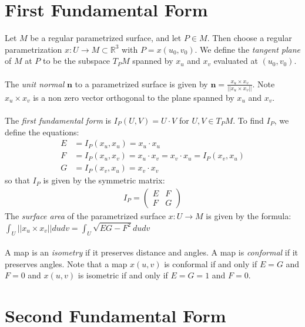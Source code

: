 \documentclass{article}
\begin{document}
    \section*{First Fundamental Form}
    Let $M$ be a regular parametrized surface, and let $P\in M$. Then choose a regular parametrization $x:U\to M\subset\mathbb{R}^3$
    with $P = x(u_0,v_0)$. We define the \textit{tangent plane} of $M$ at $P$ to be the subspace $T_PM$ spanned by $x_u$ and
    $x_v$ evaluated at $(u_0,v_0)$.\\\\
    The \textit{unit normal} $\mathbf{n}$ to a parametrized surface is given by $\mathbf{n} = \frac{x_u\times x_v}{||x_u\times x_v||}$.
    Note $x_u \times x_v$ is a non zero vector orthogonal to the plane spanned by $x_u$ and $x_v$.\\\\
    The \textit{first fundamental form} is $I_P(U,V) = U\cdot V$ for $U,V\in T_PM$. To find $I_P$, we define the equations:
    \begin{align*}
        E &= I_P(x_u,x_u) = x_u\cdot x_u \\
        F &= I_P(x_u,x_v) = x_u\cdot x_v = x_v\cdot x_u = I_P(x_v,x_u) \\
        G &= I_P(x_v,x_u) = x_v\cdot x_v
    \end{align*}
    so that $I_P$ is given by the symmetric matrix:
    \begin{align*} 
        I_P = \begin{pmatrix} E & F \\ F & G \end{pmatrix}
    \end{align*}
    The \textit{surface area} of the parametrized surface $x: U\to M$ is given by the formula:
    $ \int_U ||x_u\times x_v||dudv = \int_U \sqrt{EG-F^2}dudv $ \\\\
    A map is an \textit{isometry} if it preserves distance and angles. A map is \textit{conformal} if it preserves angles.
    Note that a map $x(u,v)$ is conformal if and only if $E=G$ and $F=0$ and $x(u,v)$ is isometric if and only if $E=G=1$ and $F=0$.
    \newpage

    \section*{Second Fundamental Form}

    
\end{document}
